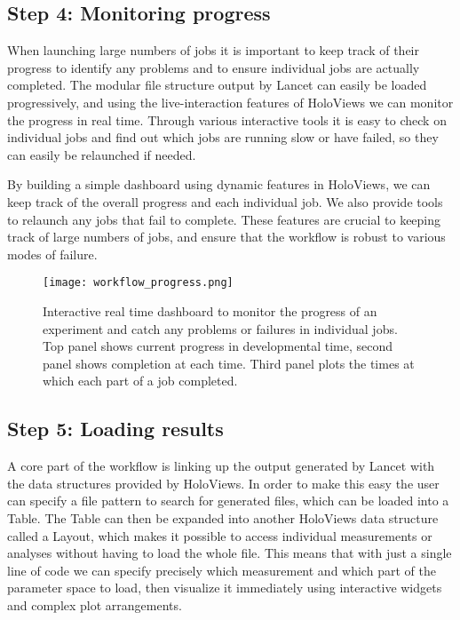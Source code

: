 \subsection{Step 4: Monitoring progress}

When launching large numbers of jobs it is important to keep track of
their progress to identify any problems and to ensure individual jobs
are actually completed. The modular file structure output by Lancet
can easily be loaded progressively, and using the live-interaction
features of HoloViews we can monitor the progress in real
time. Through various interactive tools it is easy to check on
individual jobs and find out which jobs are running slow or have
failed, so they can easily be relaunched if needed.

By building a simple dashboard using dynamic features in HoloViews, we
can keep track of the overall progress and each individual job.
We also provide tools to relaunch any jobs that fail to
complete. These features are crucial to keeping track of large numbers
of jobs, and ensure that the workflow is robust to various modes of
failure.

\begin{figure}
	\centering
        \texttt{[image: workflow\_progress.png]}
	    \caption[Interactive dashboard to monitor workflow
          progress.]{Interactive real time dashboard to monitor the
          progress of an experiment and catch any problems or failures
          in individual jobs. Top panel shows current progress in
          developmental time, second panel shows completion at each
          time. Third panel plots the times at which each part of a
          job completed.}
	\label{workflow_progress}
\end{figure}


\subsection{Step 5: Loading results}

A core part of the workflow is linking up the output generated by
Lancet with the data structures provided by HoloViews. In order to
make this easy the user can specify a file pattern to search for
generated files, which can be loaded into a Table. The Table can then
be expanded into another HoloViews data structure called a Layout,
which makes it possible to access individual measurements or analyses
without having to load the whole file. This means that with just a
single line of code we can specify precisely which measurement and
which part of the parameter space to load, then visualize it immediately
using interactive widgets and complex plot arrangements.

